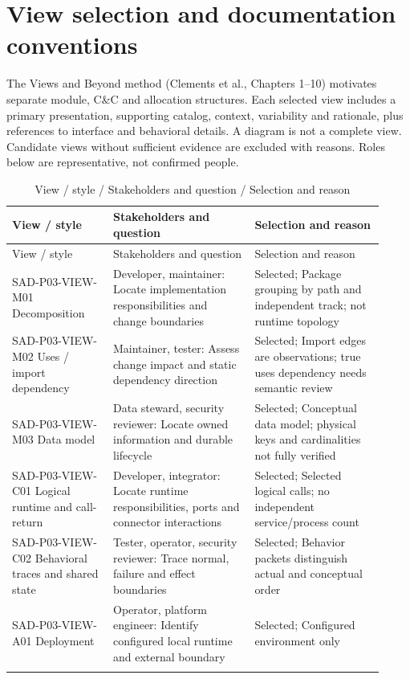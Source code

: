 \documentclass[10pt,letterpaper]{article}
\begin{document}
\section{View selection and documentation conventions}
The Views and Beyond method (Clements et al., Chapters 1--10) motivates separate module, C\&C and allocation structures. Each selected view includes a primary presentation, supporting catalog, context, variability and rationale, plus references to interface and behavioral details. A diagram is not a complete view. Candidate views without sufficient evidence are excluded with reasons. Roles below are representative, not confirmed people.
\begin{longtable}{@{}>{\raggedright\arraybackslash}p{0.25\linewidth}>{\raggedright\arraybackslash}p{0.35\linewidth}>{\raggedright\arraybackslash}p{0.32\linewidth}@{}}
\caption{View / style / Stakeholders and question / Selection and reason}\\
\toprule View / style & Stakeholders and question & Selection and reason\\\midrule\endfirsthead
\toprule View / style & Stakeholders and question & Selection and reason\\\midrule\endhead
SAD-P03-VIEW-M01 Decomposition & Developer, maintainer: Locate implementation responsibilities and change boundaries & Selected; Package grouping by path and independent track; not runtime topology\\\addlinespace
SAD-P03-VIEW-M02 Uses / import dependency & Maintainer, tester: Assess change impact and static dependency direction & Selected; Import edges are observations; true uses dependency needs semantic review\\\addlinespace
SAD-P03-VIEW-M03 Data model & Data steward, security reviewer: Locate owned information and durable lifecycle & Selected; Conceptual data model; physical keys and cardinalities not fully verified\\\addlinespace
SAD-P03-VIEW-C01 Logical runtime and call-return & Developer, integrator: Locate runtime responsibilities, ports and connector interactions & Selected; Selected logical calls; no independent service/process count\\\addlinespace
SAD-P03-VIEW-C02 Behavioral traces and shared state & Tester, operator, security reviewer: Trace normal, failure and effect boundaries & Selected; Behavior packets distinguish actual and conceptual order\\\addlinespace
SAD-P03-VIEW-A01 Deployment & Operator, platform engineer: Identify configured local runtime and external boundary & Selected; Configured environment only\\\addlinespace

\end{longtable}
\end{document}
